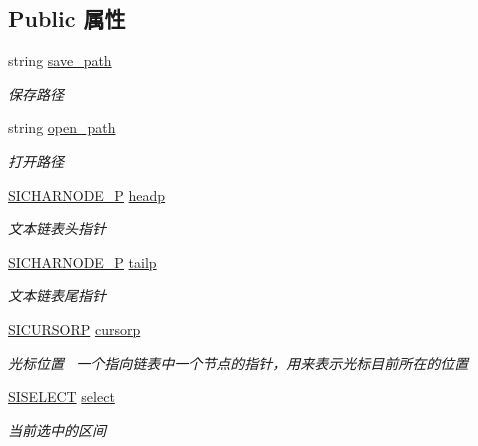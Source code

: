 \subsection*{Public 属性}
\begin{DoxyCompactItemize}
\item 
\mbox{\label{class_s_i_t_e_x_t_a0d602676667071382638f8b27850c6a6}} 
string \hyperlink{class_s_i_t_e_x_t_a0d602676667071382638f8b27850c6a6}{save\+\_\+path}
\begin{DoxyCompactList}\small\item\em 保存路径 \end{DoxyCompactList}\item 
\mbox{\label{class_s_i_t_e_x_t_a7d7def7333970c953f9daebfe22155a8}} 
string \hyperlink{class_s_i_t_e_x_t_a7d7def7333970c953f9daebfe22155a8}{open\+\_\+path}
\begin{DoxyCompactList}\small\item\em 打开路径 \end{DoxyCompactList}\item 
\hyperlink{class_s_i_c_h_a_r_n_o_d_e}{S\+I\+C\+H\+A\+R\+N\+O\+D\+E\+\_\+P} \hyperlink{class_s_i_t_e_x_t_a50c3c59ac0a71a940d688e9d4d901bee}{headp}
\begin{DoxyCompactList}\small\item\em 文本链表头指针 \end{DoxyCompactList}\item 
\hyperlink{class_s_i_c_h_a_r_n_o_d_e}{S\+I\+C\+H\+A\+R\+N\+O\+D\+E\+\_\+P} \hyperlink{class_s_i_t_e_x_t_a65fc82385d60763d2f3bcca67abf99bc}{tailp}
\begin{DoxyCompactList}\small\item\em 文本链表尾指针 \end{DoxyCompactList}\item 
\hyperlink{class_s_i_c_h_a_r_n_o_d_e}{S\+I\+C\+U\+R\+S\+O\+RP} \hyperlink{class_s_i_t_e_x_t_a1841f3bacc1a8c468203f44e904afc73}{cursorp}
\begin{DoxyCompactList}\small\item\em 光标位置~\newline
一个指向链表中一个节点的指针，用来表示光标目前所在的位置 \end{DoxyCompactList}\item 
\hyperlink{struct_s_i_r_a_n_g_e}{S\+I\+S\+E\+L\+E\+CT} \hyperlink{class_s_i_t_e_x_t_a536f8decde35b0149619ca1719c887b0}{select}
\begin{DoxyCompactList}\small\item\em 当前选中的区间 \end{DoxyCompactList}\item 

\end{DoxyCompactItemize}
